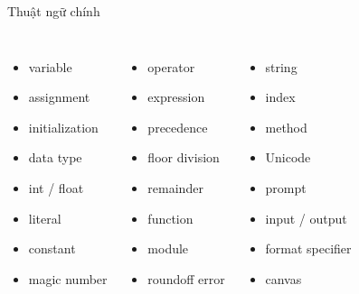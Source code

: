 \documentclass[aspectratio=169,10pt]{beamer}
\begin{document}
\begin{frame}{Thuật ngữ chính}
\scriptsize
\begin{columns}[T,onlytextwidth]
\begin{itemize}
  \item variable
  \item assignment
  \item initialization
  \item data type
  \item int / float
  \item literal
  \item constant
  \item magic number
\end{itemize}
\begin{itemize}
  \item operator
  \item expression
  \item precedence
  \item floor division
  \item remainder
  \item function
  \item module
  \item roundoff error
\end{itemize}
\begin{itemize}
  \item string
  \item index
  \item method
  \item Unicode
  \item prompt
  \item input / output
  \item format specifier
  \item canvas
\end{itemize}
\end{columns}
\end{frame}

\end{document}
